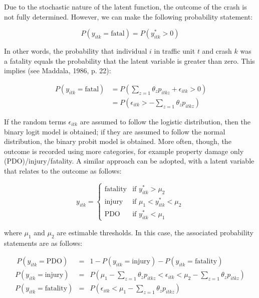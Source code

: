 \documentclass[]{elsarticle} %
\begin{document}
Due to the stochastic nature of the latent function, the outcome of the
crash is not fully determined. However, we can make the following
probability statement:

\begin{equation}
\label{eq:probability-2-outcomes}
P(y_{itk} = \text{fatal}) = P(y_{itk}^* > 0)
\end{equation}

In other words, the probability that individual \(i\) in traffic unit
\(t\) and crash \(k\) was a fatality equals the probability that the
latent variable is greater than zero. This implies (see Maddala, 1986,
p. 22):

\begin{equation}
\label{eq:probability-2-outcomes-2}
\begin{array}{rl}\
P(y_{itk} = \text{fatal}) &= P(\sum_{z=1}\theta_zp_{itkz} + \epsilon_{itk} > 0)\\ 
&=P(\epsilon_{itk} > -\sum_{z=1}\theta_zp_{itkz})
\end{array}
\end{equation}

If the random terms \(\epsilon_{itk}\) are assumed to follow the
logistic distribution, then the binary logit model is obtained; if they
are assumed to follow the normal distribution, the binary probit model
is obtained. More often, though, the outcome is recorded using more
categories, for example property damage only (PDO)/injury/fatality. A
similar approach can be adopted, with a latent variable that relates to
the outcome as follows:

\begin{equation}
\label{eq:latent-function-ordered-outcomes}
y_{itk} = 
\begin{cases}
\text{fatality} & \text{if } y_{itk}^*> \mu_2\\
\text{injury} & \text{if } \mu_1< y_{itk}^*< \mu_2\\
\text{PDO} & \text{if } y_{itk}^*< \mu_1
\end{cases}
\end{equation}

\noindent where \(\mu_1\) and \(\mu_2\) are estimable thresholds. In
this case, the associated probability statements are as follows:

\begin{equation}
\label{eq:probability-ordered-outcomes}
\begin{array}{rcl}\
P(y_{itk} = \text{PDO}) &=& 1 - P(y_{itk} = \text{injury}) - P(y_{itk} = \text{fatality})\\ 
P(y_{itk} = \text{injury}) &=& P(\mu_1 - \sum_{z=1}\theta_zp_{itkz} < \epsilon_{itk} < \mu_2 - \sum_{z=1}\theta_zp_{itkz})\\
P(y_{itk} = \text{fatality}) &=& P(\epsilon_{itk} < \mu_1 - \sum_{z=1}\theta_zp_{itkz})
\end{array}
\end{equation}
\end{document}
